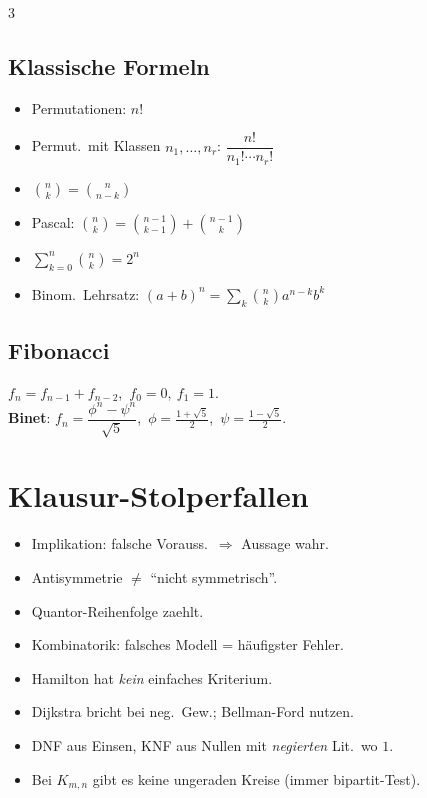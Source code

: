 \documentclass[8pt,a4paper]{extarticle}
\begin{document}
\begin{multicols*}{3}
\subsection{Klassische Formeln}
\begin{itemize}
\item Permutationen: $n!$
\item Permut.\ mit Klassen $n_1,\dots,n_r$: $\dfrac{n!}{n_1!\cdots n_r!}$
\item $\binom{n}{k}=\binom{n}{n-k}$
\item Pascal: $\binom{n}{k}{=}\binom{n-1}{k-1}{+}\binom{n-1}{k}$
\item $\sum_{k=0}^n\binom{n}{k}=2^n$
\item Binom.\ Lehrsatz: $(a{+}b)^n=\sum_k\binom{n}{k}a^{n-k}b^k$
\end{itemize}

\subsection{Fibonacci}
$f_n=f_{n-1}{+}f_{n-2}$,\ $f_0{=}0,\ f_1{=}1$.\\
\textbf{Binet}: $f_n=\dfrac{\phi^n-\psi^n}{\sqrt 5}$,\ $\phi{=}\tfrac{1+\sqrt5}{2}$,\ $\psi{=}\tfrac{1-\sqrt5}{2}$.

\section{Klausur-Stolperfallen}
\begin{itemize}
\item Implikation: falsche Vorauss.\ $\Rightarrow$ Aussage wahr.
\item Antisymmetrie $\ne$ ``nicht symmetrisch''.
\item Quantor-Reihenfolge zaehlt.
\item Kombinatorik: falsches Modell = h\"aufigster Fehler.
\item Hamilton hat \emph{kein} einfaches Kriterium.
\item Dijkstra bricht bei neg.\ Gew.; Bellman-Ford nutzen.
\item DNF aus Einsen, KNF aus Nullen mit \emph{negierten} Lit.\ wo $1$.
\item Bei $K_{m,n}$ gibt es keine ungeraden Kreise (immer bipartit-Test).
\end{itemize}

\end{multicols*}
\end{document}
